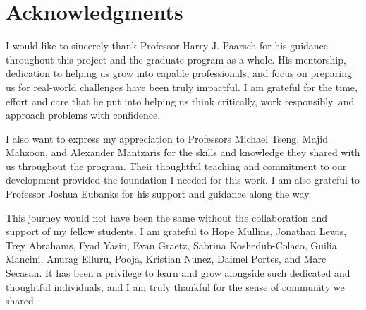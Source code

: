 \section*{Acknowledgments}

I would like to sincerely thank Professor Harry J. Paarsch for his guidance throughout this project and the graduate program as a whole. His mentorship, dedication to helping us grow into capable professionals, and focus on preparing us for real-world challenges have been truly impactful. I am grateful for the time, effort and care that he put into helping us think critically, work responsibly, and approach problems with confidence.

I also want to express my appreciation to Professors Michael Tseng, Majid Mahzoon, and Alexander Mantzaris for the skills and knowledge they shared with us throughout the program. Their thoughtful teaching and commitment to our development provided the foundation I needed for this work. I am also grateful to Professor Joshua Eubanks for his support and guidance along the way.

This journey would not have been the same without the collaboration and support of my fellow students. I am grateful to Hope Mullins, Jonathan Lewis, Trey Abrahams, Fyad Yasin, Evan Graetz, Sabrina Koshedub-Colaco, Guilia Mancini, Anurag Elluru, Pooja, Kristian Nunez, Daimel Portes, and Marc Secasan. It has been a privilege to learn and grow alongside such  dedicated and thoughtful individuals, and I am truly thankful for the sense of community we shared.



\clearpage
